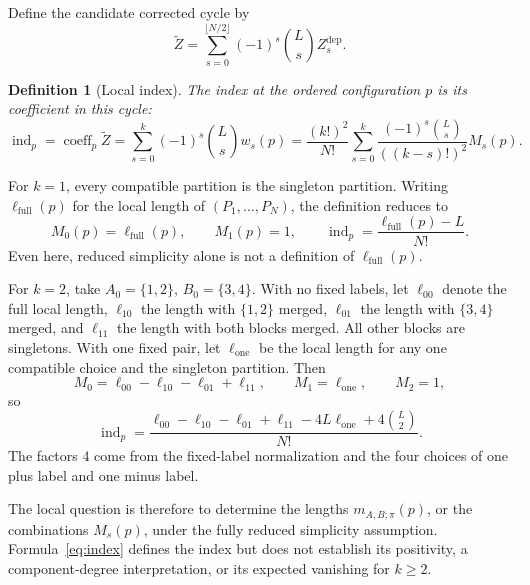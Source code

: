 \documentclass[11pt]{article}
\newtheorem{definition}{Definition}[section]
\newcommand{\ind}{\operatorname{ind}}
\newcommand{\coeff}{\operatorname{coeff}}
\begin{document}
Define the candidate corrected cycle by
\[
 \widetilde Z=
 \sum_{s=0}^{\lfloor N/2\rfloor}
        (-1)^s\binom Ls Z_s^{\mathrm{dep}}.
\]
\begin{definition}[Local index]
The index at the ordered configuration $p$ is its coefficient in this
cycle:
\begin{equation}\label{eq:index}
 \boxed{
 \ind_p=\coeff_p\widetilde Z
       =\sum_{s=0}^k(-1)^s\binom Ls w_s(p)
       =\frac{(k!)^2}{N!}
          \sum_{s=0}^k
          \frac{(-1)^s\binom Ls}{((k-s)!)^2}M_s(p).}
\end{equation}
\end{definition}

For $k=1$, every compatible partition is the singleton partition.
Writing $\ell_{\mathrm{full}}(p)$ for the local length of
$(P_1,\ldots,P_N)$, the definition reduces to
\[
 M_0(p)=\ell_{\mathrm{full}}(p),\qquad M_1(p)=1,\qquad
 \ind_p=\frac{\ell_{\mathrm{full}}(p)-L}{N!}.
\]
Even here, reduced simplicity alone is not a definition of
$\ell_{\mathrm{full}}(p)$.

For $k=2$, take $A_0=\{1,2\}$, $B_0=\{3,4\}$.
With no fixed labels, let $\ell_{00}$ denote the full local length,
$\ell_{10}$ the length with $\{1,2\}$ merged,
$\ell_{01}$ the length with $\{3,4\}$ merged, and
$\ell_{11}$ the length with both blocks merged.
All other blocks are singletons. With one fixed pair, let
$\ell_{\mathrm{one}}$ be the local length for any one compatible
choice and the singleton partition. Then
\[
 M_0=\ell_{00}-\ell_{10}-\ell_{01}+\ell_{11},\qquad
 M_1=\ell_{\mathrm{one}},\qquad M_2=1,
\]
so
\[
 \ind_p=
 \frac{\ell_{00}-\ell_{10}-\ell_{01}+\ell_{11}
       -4L\ell_{\mathrm{one}}+4\binom L2}{N!}.
\]
The factors $4$ come from the fixed-label normalization and the
four choices of one plus label and one minus label.

The local question is therefore to determine the lengths
$m_{A,B;\pi}(p)$, or the combinations $M_s(p)$, under the fully
reduced simplicity assumption. Formula~\eqref{eq:index} defines
the index but does not establish its positivity, a component-degree
interpretation, or its expected vanishing for $k\geq2$.
\end{document}
